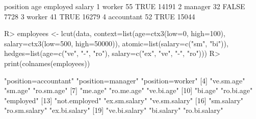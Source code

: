 \begin{Schunk}
% --begin: "lcut.data.frame2"
\begin{Soutput}
    position age employed salary
1     worker  55     TRUE  14191
2    manager  32    FALSE   7728
3     worker  41     TRUE  16279
4 accountant  52     TRUE  15044
\end{Soutput}
\begin{Sinput}
R> employees <- lcut(data,
                     context=list(age=ctx3(low=0, high=100),
                                  salary=ctx3(low=500, high=50000)),
                     atomic=list(salary=c("sm", "bi")),
                     hedges=list(age=c("ve", "-", "ro"),
                                 salary=c("ex", "ve", "-", "ro")))
R> print(colnames(employees))
\end{Sinput}
\begin{Soutput}
 [1] "position=accountant" "position=manager"    "position=worker"    
 [4] "ve.sm.age"           "sm.age"              "ro.sm.age"          
 [7] "me.age"              "ro.me.age"           "ve.bi.age"          
[10] "bi.age"              "ro.bi.age"           "employed"           
[13] "not.employed"        "ex.sm.salary"        "ve.sm.salary"       
[16] "sm.salary"           "ro.sm.salary"        "ex.bi.salary"       
[19] "ve.bi.salary"        "bi.salary"           "ro.bi.salary"       
\end{Soutput}
%
% --end: "lcut.data.frame2"
\end{Schunk}
